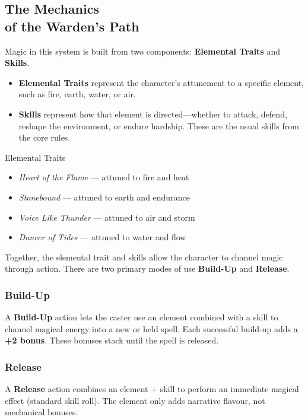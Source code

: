 \subsection{The Mechanics\\ of the Warden’s Path}

Magic in this system is built from two components: \textbf{Elemental Traits} and \textbf{Skills}.

\begin{itemize}\raggedright
    \item \textbf{Elemental Traits} represent the character’s attunement to a specific element, such as fire, earth, water, or air.
    \item \textbf{Skills} represent how that element is directed—whether to attack, defend, reshape the environment, or endure hardship. These are the usual skills from the core rules.
\end{itemize}

\begin{Example}{Elemental Traits}
    \begin{itemize}
        \item \textit{Heart of the Flame} — attuned to fire and heat  
        \item \textit{Stonebound} — attuned to earth and endurance  
        \item \textit{Voice Like Thunder} — attuned to air and storm  
        \item \textit{Dancer of Tides} — attuned to water and flow  
    \end{itemize}
\end{Example}

Together, the elemental trait and skills allow the character to channel magic through action. There are two primary modes of use \textbf{Build-Up} and \textbf{Release}.

\subsubsection{Build-Up}
A \textbf{Build-Up} action lets the caster use an element combined with a skill to channel magical energy into a new or held spell. Each successful build-up adds a \textbf{+2 bonus}. These bonuses stack until the spell is released.


\subsubsection{Release}
A \textbf{Release} action combines an element + skill to perform an immediate magical effect (standard skill roll). The element only adds narrative flavour, not mechanical bonuses.


